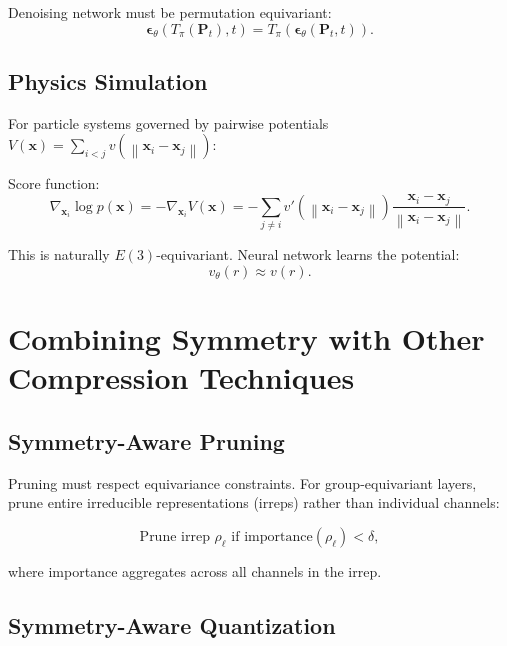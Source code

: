 \documentclass[12pt]{report}
\theoremstyle{definition}
\newcommand{\norm}[1]{\left\| #1 \right\|}
\begin{document}
Denoising network must be permutation equivariant:
\begin{equation}
\boldsymbol{\epsilon}_\theta(T_\pi(\mathbf{P}_t), t) = T_\pi(\boldsymbol{\epsilon}_\theta(\mathbf{P}_t, t)).
\label{eq:permutation_equivariant_denoiser}
\end{equation}

\subsection{Physics Simulation}

For particle systems governed by pairwise potentials $V(\mathbf{x}) = \sum_{i<j} v(\norm{\mathbf{x}_i - \mathbf{x}_j})$:

Score function:
\begin{equation}
\nabla_{\mathbf{x}_i} \log p(\mathbf{x}) = -\nabla_{\mathbf{x}_i} V(\mathbf{x}) = -\sum_{j \neq i} v'(\norm{\mathbf{x}_i - \mathbf{x}_j}) \frac{\mathbf{x}_i - \mathbf{x}_j}{\norm{\mathbf{x}_i - \mathbf{x}_j}}.
\label{eq:pairwise_score}
\end{equation}

This is naturally $E(3)$-equivariant. Neural network learns the potential:
\begin{equation}
v_\theta(r) \approx v(r).
\label{eq:learned_potential}
\end{equation}

\section{Combining Symmetry with Other Compression Techniques}

\subsection{Symmetry-Aware Pruning}

Pruning must respect equivariance constraints. For group-equivariant layers, prune entire irreducible representations (irreps) rather than individual channels:

\begin{equation}
\text{Prune irrep } \rho_\ell \text{ if } \text{importance}(\rho_\ell) < \delta,
\label{eq:irrep_pruning}
\end{equation}

where importance aggregates across all channels in the irrep.

\subsection{Symmetry-Aware Quantization}
\end{document}
